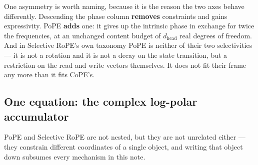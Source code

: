 \documentclass[11pt]{article}
\newcommand{\hd}{d_{\mathrm{head}}}
\begin{document}
\medskip
\noindent One asymmetry is worth naming, because it is the reason the two axes
behave differently. Descending the phase column \textbf{removes} constraints and
gains expressivity. PoPE \textbf{adds} one: it gives up the intrinsic phase in
exchange for twice the frequencies, at an unchanged content budget of $\hd$ real
degrees of freedom. And in Selective RoPE's own taxonomy PoPE is neither of their
two selectivities --- it is not a rotation and it is not a decay on the state
transition, but a restriction on the read and write vectors themselves. It does
not fit their frame any more than it fits CoPE's.

\subsection{One equation: the complex log-polar accumulator}
\label{sec:unify}

PoPE and Selective RoPE are not nested, but they are not unrelated either --- they
constrain different coordinates of a single object, and writing that object down
subsumes every mechanism in this note.
\end{document}
